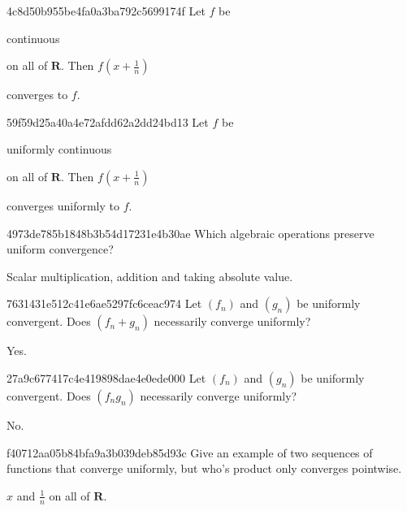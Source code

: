 \begin{note}{4c8d50b955be4fa0a3ba792c5699174f}
    Let \({ f }\) be \begin{icloze}{2}continuous\end{icloze} on all of \({ \mathbf{R} }\).
    Then \({ f(x + \frac{1}{n}) }\) \begin{icloze}{1}converges to \({ f }\).\end{icloze}
\end{note}

\begin{note}{59f59d25a40a4e72afdd62a2dd24bd13}
    Let \({ f }\) be \begin{icloze}{2}uniformly continuous\end{icloze} on all of \({ \mathbf{R} }\).
    Then \({ f(x + \frac{1}{n}) }\) \begin{icloze}{1}converges uniformly to \({ f }\).\end{icloze}
\end{note}

\begin{note}{4973de785b1848b3b54d17231e4b30ae}
    Which algebraic operations preserve uniform convergence?

    \begin{cloze}{1}
        Scalar multiplication, addition and taking absolute value.
    \end{cloze}
\end{note}

\begin{note}{7631431e512c41e6ae5297fc6ceac974}
    Let \({ (f_n) }\) and \({ (g_n) }\) be uniformly convergent.
    Does \({ (f_n + g_n) }\) necessarily converge uniformly?

    \begin{cloze}{1}
        Yes.
    \end{cloze}
\end{note}

\begin{note}{27a9c677417c4e419898dae4e0ede000}
    Let \({ (f_n) }\) and \({ (g_n) }\) be uniformly convergent.
    Does \({ (f_n g_n) }\) necessarily converge uniformly?

    \begin{cloze}{1}
        No.
    \end{cloze}
\end{note}

\begin{note}{f40712aa05b84bfa9a3b039deb85d93c}
    Give an example of two sequences of functions that converge uniformly, but who's product only converges pointwise.

    \begin{cloze}{1}
        \({ x }\) and \({ \frac{1}{n} }\) on all of \({ \mathbf{R} }\).
    \end{cloze}
\end{note}


